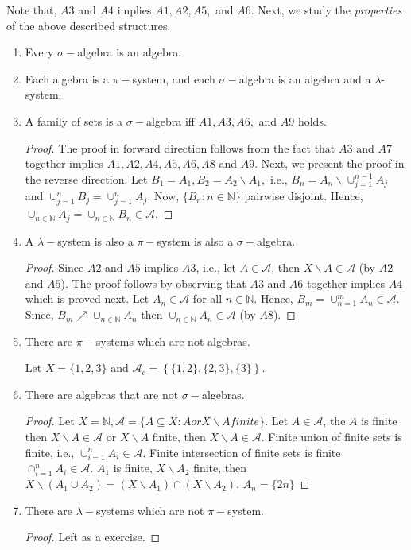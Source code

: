\documentclass[a4paper,english,12pt]{article}   	%
\begin{document}
Note that, $A3$ and $A4$ implies $A1, A2, A5,$ and $A6$. Next, we study the \emph{properties} of the above described structures.  

\begin{enumerate}
  \item Every $\sigma-$algebra is an algebra. 
  \item Each algebra is a $\pi-$system, and each $\sigma-$algebra is an algebra and a $\lambda$-system.
  \item A family of sets is a $\sigma-$algebra iff $A1,A3, A6, $ and $ A9$ holds.
  \begin{proof}
  The proof in forward direction follows from the fact that $A3$ and $A7$ together implies $A1,A2, A4, A5, A6, A8$ and $A9$. Next, we present the proof in the reverse direction. Let $B_1=A_1, B_2= A_2\backslash A_1,$ i.e., $B_n=A_n\backslash\cup_{j=1}^{n-1}A_j$ and $\cup_{j=1}^nB_j =\cup_{j=1}^nA_j$. Now, $\{B_n:n\in\mathds{N}\}$ pairwise disjoint. Hence,  $\cup_{n\in\mathds{N}}A_j=\cup_{n\in\mathds{N}} B_n \in\mathcal{A}$.
  \end{proof}
  \item A $\lambda-$system is also a $\pi-$system is also a $\sigma-$algebra. 
  \begin{proof}
   Since $A2$ and $A5$ implies $A3$, i.e., let $A\in \mathcal{A}$, then $X\backslash A \in \mathcal{A}$ (by $A2$ and $A5$). The proof follows by observing that $A3$ and $A6$ together implies $A4$ which is proved next. Let $A_n \in \mathcal{A}$ for all $n\in\mathds{N}$. Hence, $B_m = \cup_{n=1}^m A_n \in \mathcal{A}$. Since, $B_m\nearrow \cup_{n\in \mathds{N}} A_n$ then $\cup_{n\in \mathds{N}} A_n \in \mathcal{A}$ (by $A8$).
  \end{proof}
  \item There are $\pi-$systems which are not algebras.
\begin{exmp}
 Let $X=\{1,2,3\}$ and $\mathcal{A}_c=\left\{ \{1,2\},\{2,3\},\{3\} \right\}$. 
\end{exmp}
  \item There are algebras that are not $\sigma-$algebras.
  \begin{proof}
    Let $X=\mathds{N}, \mathcal{A}=\{A\subseteq X: A or X \backslash A finite\}$. Let $A\in\mathcal{A}$, the $A$ is finite then $X\backslash A \in \mathcal{A}$ or $X\backslash A$ finite, then $X\backslash A \in \mathcal{A}$. Finite union of finite sets is finite, i.e., $\cup_{i=1}^n A_i \in \mathcal{A}$. Finite intersection of finite sets is finite $\cap_{i=1}^n A_i\in \mathcal{A}$. $A_1$ is finite, $X\backslash A_2$ finite, then $X\backslash (A_1\cup A_2) = (X\backslash A_1)\cap (X\backslash A_2)$. $A_n=\{2n\}$   \end{proof}
  \item There are $\lambda-$systems which are not $\pi-$system.
  \begin{proof}
    Left as a exercise.
  \end{proof}
\end{enumerate}
\end{document}
